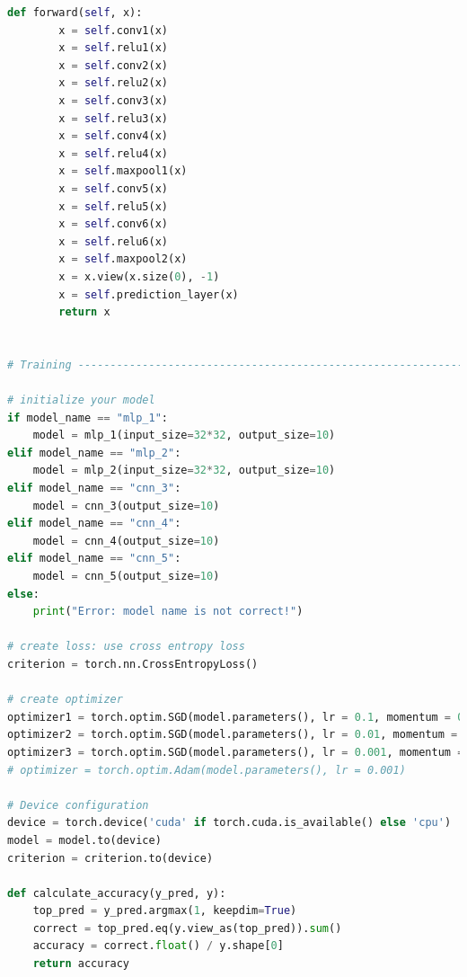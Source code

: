 \documentclass[3p,times,procedia]{elsarticle}
\begin{document}
\begin{lstlisting}[language=Python]
    def forward(self, x):
        x = self.conv1(x)
        x = self.relu1(x)
        x = self.conv2(x)
        x = self.relu2(x)
        x = self.conv3(x)
        x = self.relu3(x)
        x = self.conv4(x)
        x = self.relu4(x)
        x = self.maxpool1(x)
        x = self.conv5(x)
        x = self.relu5(x)
        x = self.conv6(x)
        x = self.relu6(x)
        x = self.maxpool2(x)
        x = x.view(x.size(0), -1)
        x = self.prediction_layer(x)
        return x


# Training --------------------------------------------------------------------------------------------------------------------------------------------#

# initialize your model
if model_name == "mlp_1":
    model = mlp_1(input_size=32*32, output_size=10)
elif model_name == "mlp_2":
    model = mlp_2(input_size=32*32, output_size=10)
elif model_name == "cnn_3":
    model = cnn_3(output_size=10)
elif model_name == "cnn_4":
    model = cnn_4(output_size=10)
elif model_name == "cnn_5":
    model = cnn_5(output_size=10)
else:
    print("Error: model name is not correct!")

# create loss: use cross entropy loss
criterion = torch.nn.CrossEntropyLoss()

# create optimizer
optimizer1 = torch.optim.SGD(model.parameters(), lr = 0.1, momentum = 0.0)
optimizer2 = torch.optim.SGD(model.parameters(), lr = 0.01, momentum = 0.0)
optimizer3 = torch.optim.SGD(model.parameters(), lr = 0.001, momentum = 0.0)
# optimizer = torch.optim.Adam(model.parameters(), lr = 0.001)

# Device configuration
device = torch.device('cuda' if torch.cuda.is_available() else 'cpu')
model = model.to(device)
criterion = criterion.to(device)

def calculate_accuracy(y_pred, y):
    top_pred = y_pred.argmax(1, keepdim=True)
    correct = top_pred.eq(y.view_as(top_pred)).sum()
    accuracy = correct.float() / y.shape[0]
    return accuracy


\end{lstlisting}
\end{document}
